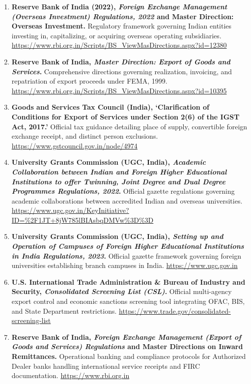 \begin{enumerate}
    \item \textbf{Reserve Bank of India (2022), \textit{Foreign Exchange Management (Overseas Investment) Regulations, 2022} and Master Direction: Overseas Investment.} Regulatory framework governing Indian entities investing in, capitalizing, or acquiring overseas operating subsidiaries. \url{https://www.rbi.org.in/Scripts/BS_ViewMasDirections.aspx?id=12380}
    \item \textbf{Reserve Bank of India, \textit{Master Direction: Export of Goods and Services}.} Comprehensive directions governing realization, invoicing, and repatriation of export proceeds under FEMA, 1999. \url{https://www.rbi.org.in/Scripts/BS_ViewMasDirections.aspx?id=10395}
    \item \textbf{Goods and Services Tax Council (India), `Clarification of Conditions for Export of Services under Section 2(6) of the IGST Act, 2017.'} Official tax guidance detailing place of supply, convertible foreign exchange receipt, and distinct person exclusions. \url{https://www.gstcouncil.gov.in/node/4974}
    \item \textbf{University Grants Commission (UGC, India), \textit{Academic Collaboration between Indian and Foreign Higher Educational Institutions to offer Twinning, Joint Degree and Dual Degree Programmes Regulations, 2022}.} Official gazette regulations governing academic collaborations between accredited Indian and overseas universities. \url{https://www.ugc.gov.in/KeyInitiative?ID=%2F1JT+8jW785lBIAsbqDMVw%3D%3D}
    \item \textbf{University Grants Commission (UGC, India), \textit{Setting up and Operation of Campuses of Foreign Higher Educational Institutions in India Regulations, 2023}.} Official gazette framework governing foreign universities establishing branch campuses in India. \url{https://www.ugc.gov.in}
    \item \textbf{U.S. International Trade Administration \& Bureau of Industry and Security, \textit{Consolidated Screening List (CSL)}.} Official multi-agency export control and economic sanctions screening tool integrating OFAC, BIS, and State Department restrictions. \url{https://www.trade.gov/consolidated-screening-list}
    \item \textbf{Reserve Bank of India, \textit{Foreign Exchange Management (Export of Goods and Services) Regulations} and Master Directions on Inward Remittances.} Operational banking and compliance protocols for Authorized Dealer banks handling international service receipts and FIRC documentation. \url{https://www.rbi.org.in}
\end{enumerate}
